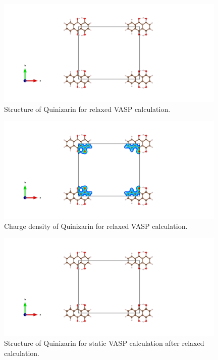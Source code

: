 \documentclass{article}
\begin{document}
  \begin{figure}[H]
      \centering
      \includegraphics[width = 11cm]{../fig/basic_relax_CONTCAR.png}
      \caption{Structure of Quinizarin for relaxed VASP calculation. }
      \label{fig:basic_relax_CONTCAR}
  \end{figure}

  \begin{figure}[H]
      \centering
      \includegraphics[width = 11cm]{../fig/basic_relax_CHGCAR.png}
      \caption{Charge density of Quinizarin for relaxed VASP calculation. }
      \label{fig:basic_relax_CHGCAR}
  \end{figure}

  \begin{figure}[H]
      \centering
      \includegraphics[width = 11cm]{../fig/basic_staticafter_CONTCAR.png}
      \caption{Structure of Quinizarin for static VASP calculation after relaxed calculation. }
      \label{fig:basic_staticafter_CONTCAR}
  \end{figure}
\end{document}
